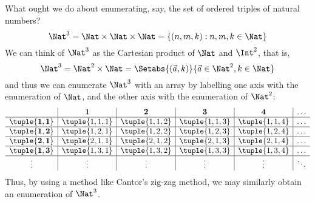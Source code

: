 \documentclass[../../include/open-logic-section]{subfiles}
\begin{document}
\begin{explain}
What ought we do about enumerating, say, the set of ordered triples 
of natural numbers?
\[ 
\Nat^3 = \Nat \times \Nat \times \Nat = \{ (n,m,k) : n,m,k \in \Nat \} 
\]
We can think of $\Nat^3$ as the Cartesian product of
$\Nat$ and $\Int^2$, that is, 
\[ 
\Nat^3 = \Nat^2 \times \Nat = \Setabs{(\vec a, 
k)}{\vec a \in \Nat^2, k \in \Nat } 
\]
and thus we can enumerate $\Nat^3$ with an array by 
labelling one axis with the enumeration of $\Nat$, and the 
other axis with the enumeration of $\Nat^2$:
\[
\begin{array}{ c | c | c | c | c | c}
& \textbf 1 & \textbf 2 & \textbf 3 & \textbf 4 & \dots \\
\hline
\mathbf{\tuple{1,1}} & \tuple{1,1,1} & \tuple{1,1,2} & \tuple{1,1,3} & \tuple{1,1,4} & \dots \\
\hline
\mathbf{\tuple{1,2}} & \tuple{1,2,1} & \tuple{1,2,2} & \tuple{1,2,3} & \tuple{1,2,4} & \dots \\
\hline
\mathbf{\tuple{2,1}} & \tuple{2,1,1} & \tuple{2,1,2} & \tuple{2,1,3} & \tuple{2,1,4} & \dots \\
\hline
\mathbf{\tuple{1,3}} & \tuple{1,3,1} & \tuple{1,3,2} & \tuple{1,3,3} & \tuple{1,3,4} & \dots\\
\hline
\vdots & \vdots & \vdots & \vdots & \vdots & \ddots \\
\end{array}
\]
Thus, by using a method like Cantor's zig-zag method, we may 
similarly obtain an enumeration of $\Nat^3$. 
\end{explain}
\end{document}
